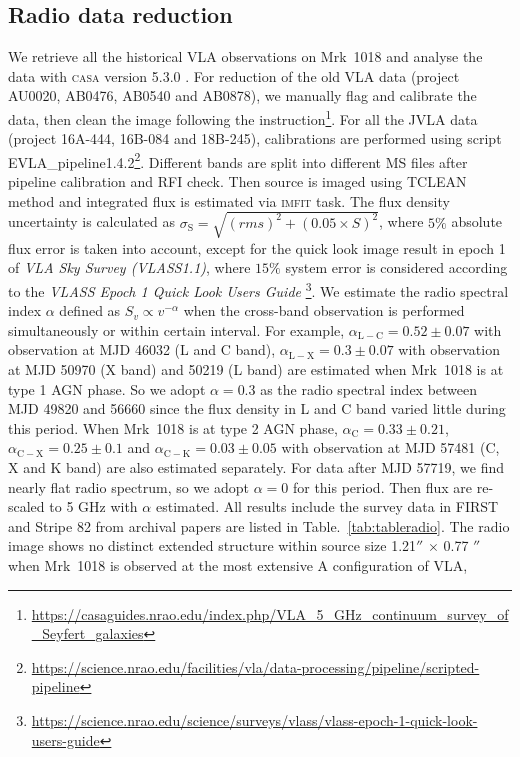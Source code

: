 \documentclass[twocolumn]{aastex63}
\begin{document}


\subsection{Radio data reduction}
\label{subsec:vla}
We retrieve all the historical VLA observations on Mrk~1018 and analyse the data with \textsc{casa} version 5.3.0 \citep{2007ASPC..376..127M}. For reduction of the old VLA data (project AU0020, AB0476, AB0540 and AB0878), we manually flag and calibrate the data, then clean the image following the instruction\footnote{\url{https://casaguides.nrao.edu/index.php/VLA_5_GHz_continuum_survey_of_Seyfert_galaxies}}. For all the JVLA data (project 16A-444, 16B-084 and 18B-245), calibrations are performed using script {EVLA\_pipeline1.4.2}\footnote{\url{https://science.nrao.edu/facilities/vla/data-processing/pipeline/scripted-pipeline}}. Different bands are split into different MS files after pipeline calibration and RFI check. Then source is imaged using {\scriptsize TCLEAN} method and integrated flux is estimated via \textsc{imfit} task. The flux density uncertainty is calculated as $\sigma_\mathrm{S}=\sqrt{(rms)^2+(0.05\times S)^2}$, where $5 \%$ absolute flux error is taken into account, except for the quick look image result in epoch 1 of  {\em VLA Sky Survey (VLASS1.1)}, where $15 \%$ system error is considered according to the {\em VLASS Epoch 1 Quick Look Users Guide} \footnote{\url{https://science.nrao.edu/science/surveys/vlass/vlass-epoch-1-quick-look-users-guide}}. We estimate the radio spectral index $\alpha$ defined as $S_v \propto v^{-\alpha}$ when the cross-band observation is performed simultaneously or within certain interval. For example, $\alpha_\mathrm{L-C} =0.52 \pm 0.07$ with observation at MJD 46032 (L and C band), $\alpha_\mathrm{L-X} =0.3 \pm 0.07$ with observation at MJD 50970 (X band) and 50219 (L band) are estimated when Mrk~1018 is at type 1 AGN phase. So we adopt $\alpha=0.3$ as the radio spectral index between MJD 49820 and 56660 since the flux density in L and C band varied little during this period. When Mrk~1018 is at type 2 AGN phase, $\alpha_\mathrm{C} =0.33\pm0.21$, $\alpha_\mathrm{C-X} =0.25\pm0.1$ and $\alpha_\mathrm{C-K} =0.03\pm0.05$ with observation at MJD 57481 (C, X and K band) are also estimated separately. For data after MJD 57719, we find nearly flat radio spectrum, so we adopt $\alpha=0$ for this period. Then flux are re-scaled to 5 GHz with $\alpha$ estimated.  All results include the survey data in FIRST\citep{1994ASPC...61..165B,1995ApJ...450..559B} and Stripe 82\citep{2011AJ....142....3H} from archival papers are listed in Table.~\ref{tab:tableradio}. The radio image shows no distinct extended structure within source size 1.21$''$ $\times$ 0.77 $''$ when Mrk~1018 is observed at the most extensive A configuration of VLA, 
\end{document}
